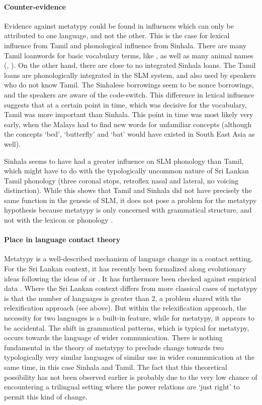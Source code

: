 \paragraph{Counter-evidence}
Evidence against metatypy could be found in influences which can only be attributed to one language, and not the other. This is the case for lexical influence from Tamil and phonological influence from Sinhala. There are many Tamil loanwords for basic vocabulary terms, like , as well as many animal names (, ). On the other hand, there are close to no integrated Sinhala loans. The Tamil loans are phonologically integrated in the SLM system, and also used by speakers who do not know Tamil. The Sinhalese borrowings seem to be nonce borrowings, and the speakers are aware of the code-switch. This difference in lexical influence suggests that at a certain point in time, which was decisive for the vocabulary, Tamil was more important than Sinhala. This point in time was most likely very early, when the Malays had to find new words for unfamiliar concepts (although the concepts `bed',  `butterfly' and `bat' would have existed in South East Asia as well).

Sinhala seems to have had a greater influence on SLM phonology than Tamil, which might have to do with the typologically uncommon nature of Sri Lankan Tamil phonology (three coronal stops, retroflex nasal and lateral, no voicing distinction).
While this shows that Tamil and Sinhala did not have precisely the same function in the genesis of SLM, it does not pose a problem for the metatypy hypothesis because metatypy is only concerned with grammatical structure, and not with the lexicon or phonology \citep{Ross2007}.

\paragraph{Place in language contact theory}
Metatypy is a well-described mechanism of language change in a contact setting. For the Sri Lankan context, it has recently \citep{Ansaldo2009clfet,Ansaldo2009book} been formalized along evolutionary ideas following the ideas of \citet{Croft2000elc} or \citet{Mufwene2001ele}. It has furthermore  been checked against empirical data \citep{AnsaldoEtAlFCLT}. Where the Sri Lankan context differs from more classical cases of metatypy is that the number of languages is greater than 2, a problem shared with the relexification approach (see above). But within the relexification approach, the necessity for two languages is a built-in feature, while for metatypy, it appears to be accidental. The shift in grammatical patterns, which is typical for metatypy, occurs towards the language of wider communication. There is nothing fundamental in the theory of metatypy to preclude change towards two typologically very similar languages of similar use in wider communication at the same time, in this case Sinhala and Tamil. The fact that this theoretical possibility has not been observed earlier is probably due to the very low chance of encountering a trilingual setting where the power relations are `just right' to permit this kind of change.


